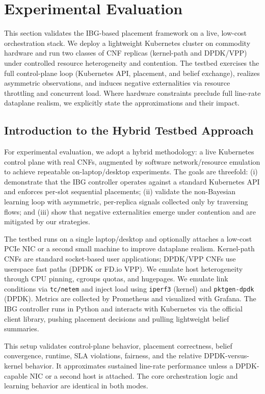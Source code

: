 \documentclass[journal]{IEEEtran}
\theoremstyle{plain}
\theoremstyle{definition}
\theoremstyle{remark}
\begin{document}
\section{Experimental Evaluation}
\label{sec:experiments}

This section validates the IBG-based placement framework on a live, low-cost orchestration stack. We deploy a lightweight Kubernetes cluster on commodity hardware and run two classes of CNF replicas (kernel-path and DPDK/VPP) under controlled resource heterogeneity and contention. The testbed exercises the full control-plane loop (Kubernetes API, placement, and belief exchange), realizes asymmetric observations, and induces negative externalities via resource throttling and concurrent load. Where hardware constraints preclude full line-rate dataplane realism, we explicitly state the approximations and their impact.

\subsection{Introduction to the Hybrid Testbed Approach}
\label{sec:exp_intro_hybrid}

For experimental evaluation, we adopt a hybrid methodology: a live Kubernetes control plane with real CNFs, augmented by software network/resource emulation to achieve repeatable on-laptop/desktop experiments. The goals are threefold: (i) demonstrate that the IBG controller operates against a standard Kubernetes API and enforces per-slot sequential placements; (ii) validate the non-Bayesian learning loop with asymmetric, per-replica signals collected only by traversing flows; and (iii) show that negative externalities emerge under contention and are mitigated by our strategies.

The testbed runs on a single laptop/desktop and optionally attaches a low-cost PCIe NIC or a second small machine to improve dataplane realism. Kernel-path CNFs are standard socket-based user applications; DPDK/VPP CNFs use userspace fast paths (DPDK or FD.io VPP). We emulate host heterogeneity through CPU pinning, cgroups quotas, and hugepages. We emulate link conditions via \texttt{tc/netem} and inject load using \texttt{iperf3} (kernel) and \texttt{pktgen-dpdk} (DPDK). Metrics are collected by Prometheus and visualized with Grafana. The IBG controller runs in Python and interacts with Kubernetes via the official client library, pushing placement decisions and pulling lightweight belief summaries.

This setup validates control-plane behavior, placement correctness, belief convergence, runtime, SLA violations, fairness, and the relative DPDK-versus-kernel behavior. It approximates sustained line-rate performance unless a DPDK-capable NIC or a second host is attached. The core orchestration logic and learning behavior are identical in both modes.
\end{document}
